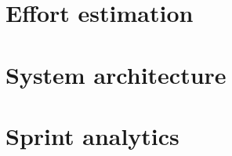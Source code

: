 \documentclass[11pt, a4paper]{article}
\begin{document}
\newpage

\section{Effort estimation}


\newpage

\section{System architecture}


\newpage

\section{Sprint analytics}
\end{document}
